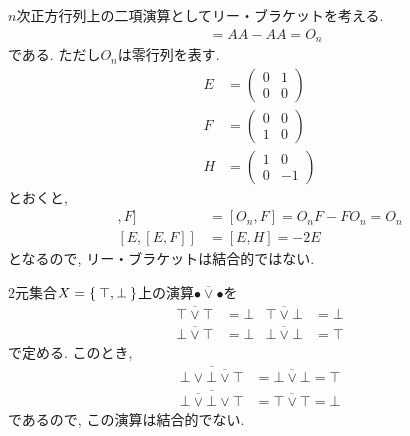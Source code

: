 \begin{nonexample}
  $n$次正方行列上の二項演算としてリー・ブラケットを考える.
  \begin{align*}
    [A,A]&=AA-AA=O_{n}
  \end{align*}
  である.  ただし$O_n$は零行列を表す.
  \begin{align*}
    E&=\begin{pmatrix}0&1\\0&0\end{pmatrix}\\
    F&=\begin{pmatrix}0&0\\1&0\end{pmatrix}\\
    H&=\begin{pmatrix}1&0\\0&-1\end{pmatrix}
  \end{align*}
  とおくと,
  \begin{align*}
    [[E,E],F]&=[O_n,F]=O_nF-FO_n=O_n\\
    [E,[E,F]]&=[E,H]=-2E
  \end{align*}
  となるので, リー・ブラケットは結合的ではない.
\end{nonexample}
\begin{nonexample}
  $2$元集合$X=\Set{\top, \bot}$上の演算$\overline{\bullet\lor\bullet}$を
  \begin{align*}
    \overline{\top \lor \top} &= \bot&
    \overline{\top \lor \bot} &= \bot\\
    \overline{\bot \lor \top} &= \bot&
    \overline{\bot \lor \bot} &= \top    
  \end{align*}
  で定める.
  このとき,
  \begin{align*}
    \overline{\bot \lor \overline{\bot \lor \top}} &=\overline{\bot \lor \bot}=\top\\
    \overline{\overline{\bot \lor \bot} \lor \top}&=
    \overline{\top \lor \top}=\bot
  \end{align*}
  であるので, この演算は結合的でない.
\end{nonexample}


